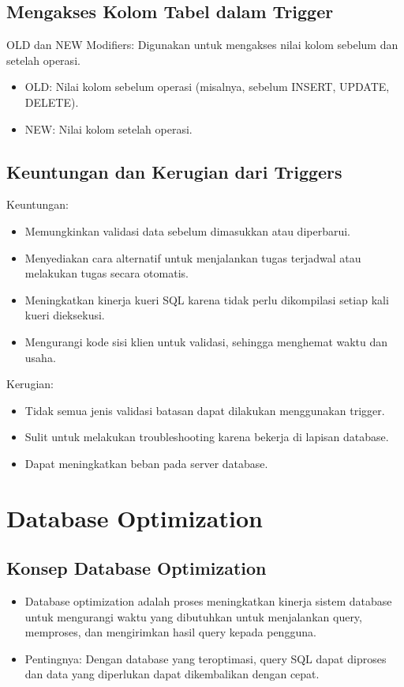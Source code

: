 \documentclass{article}
\begin{document}
\subsection{Mengakses Kolom Tabel dalam Trigger}
OLD dan NEW Modifiers: Digunakan untuk mengakses nilai kolom sebelum dan setelah operasi.
\begin{itemize}
    \item OLD: Nilai kolom sebelum operasi (misalnya, sebelum INSERT, UPDATE, DELETE).
    \item NEW: Nilai kolom setelah operasi.
\end{itemize}

\subsection{Keuntungan dan Kerugian dari Triggers}
Keuntungan:
\begin{itemize}
    \item Memungkinkan validasi data sebelum dimasukkan atau diperbarui.
    \item Menyediakan cara alternatif untuk menjalankan tugas terjadwal atau melakukan tugas secara otomatis.
    \item Meningkatkan kinerja kueri SQL karena tidak perlu dikompilasi setiap kali kueri dieksekusi.
    \item Mengurangi kode sisi klien untuk validasi, sehingga menghemat waktu dan usaha.
\end{itemize}
Kerugian:
\begin{itemize}
    \item Tidak semua jenis validasi batasan dapat dilakukan menggunakan trigger.
    \item Sulit untuk melakukan troubleshooting karena bekerja di lapisan database.
    \item Dapat meningkatkan beban pada server database.
\end{itemize}

\newpage

\section{Database Optimization}
\subsection{Konsep Database Optimization}
\begin{itemize}
    \item Database optimization adalah proses meningkatkan kinerja sistem database untuk mengurangi waktu yang dibutuhkan untuk menjalankan query, memproses, dan mengirimkan hasil query kepada pengguna.
    \item Pentingnya: Dengan database yang teroptimasi, query SQL dapat diproses dan data yang diperlukan dapat dikembalikan dengan cepat.
\end{itemize}
\end{document}
